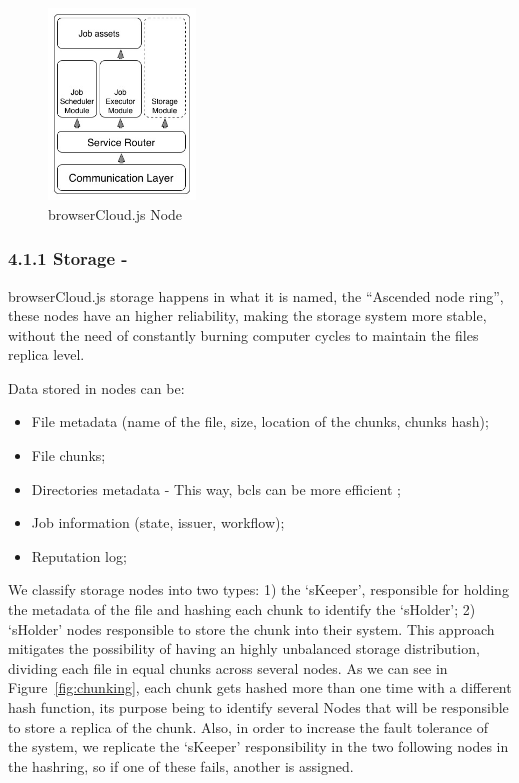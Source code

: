 \begin{figure}[h!]
  \centering
  \includegraphics[width=0.35\textwidth]{img/node.jpg}
  \caption{browserCloud.js Node}
  \label{fig:hcnode}
\end{figure}

\subsubsection{4.1.1 Storage -}

browserCloud.js storage happens in what it is named, the ``Ascended node ring'', these nodes have an higher reliability, making the storage system more stable, without the need of constantly burning computer cycles to maintain the files replica level.

Data stored in nodes can be:
\begin{itemize}
  \item File metadata (name of the file, size, location of the chunks, chunks hash);
  \item File chunks;
  \item Directories metadata - This way, bcls can be more efficient ;
  \item Job information (state, issuer, workflow);
  \item Reputation log;
\end{itemize}

We classify storage nodes into two types: 1) the `sKeeper', responsible for holding the metadata of the file and hashing each chunk to identify the `sHolder'; 2) `sHolder' nodes responsible to store the chunk into their system. This approach mitigates the possibility of having an highly unbalanced storage distribution, dividing each file in equal chunks across several nodes. As we can see in Figure~\ref{fig:chunking}, each chunk gets hashed more than one time with a different hash function, its purpose being to identify several Nodes that will be responsible to store a replica of the chunk. Also, in order to increase the fault tolerance of the system, we replicate the `sKeeper' responsibility in the two following nodes in the hashring, so if one of these fails, another is assigned.


